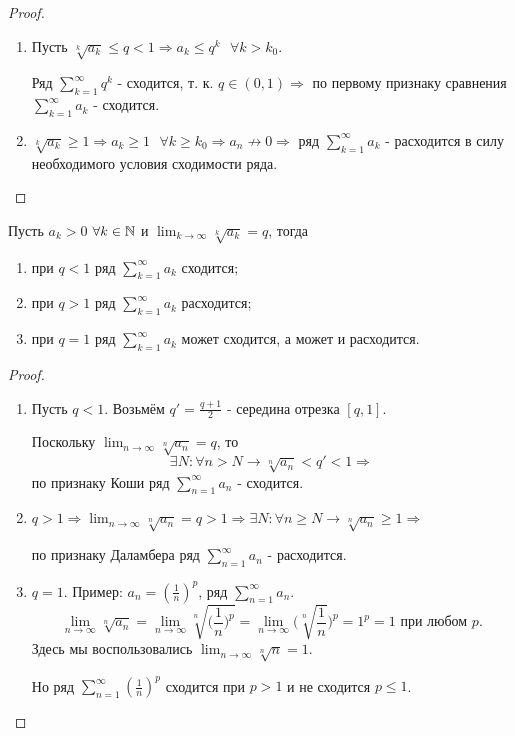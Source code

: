 	\begin{proof}
		\begin{enumerate}
			\item Пусть $\sqrt[k]{a_k} \leqslant q < 1 \Rightarrow a_k \leqslant q^k \text{ } \forall k > k_0$.
			
			Ряд $\sum_{k = 1}^{\infty} q^k$ - сходится, т. к. $q \in (0, 1) \Rightarrow$ по первому признаку сравнения $\sum_{k = 1}^{\infty} a_k$ - сходится.
			\item $\sqrt[k]{a_k} \geqslant 1 \Rightarrow a_k \geqslant 1 \text{ } \forall k \geqslant k_0 \Rightarrow a_n \not\rightarrow 0 \Rightarrow$ ряд $\sum_{k = 1}^{\infty} a_k$ - расходится в силу необходимого условия сходимости ряда.
		\end{enumerate}
	\end{proof}
	
	\begin{corollary}
		Пусть $a_k > 0$ $\forall k \in \mathbb N$ и $\displaystyle \lim_{k \to \infty} {\sqrt[k]{a_k}} = q$, тогда
		
		\begin{enumerate}
			\item при $q < 1$ ряд $\displaystyle \sum_{k = 1}^{\infty} {a_k}$ сходится;
			\item при $q > 1$ ряд $\displaystyle \sum_{k = 1}^{\infty} {a_k}$ расходится;
			\item при $q = 1$ ряд $\displaystyle \sum_{k = 1}^{\infty} {a_k}$ может сходится, а может и расходится.
		\end{enumerate}
	\end{corollary}
	
	\begin{proof}
		\begin{enumerate}
			\item Пусть $q < 1$. Возьмём $q' = \frac{q + 1}{2}$ - середина отрезка $[q, 1]$.
			
			Поскольку $\lim_{n \to \infty} \sqrt[n]{a_n} = q$, то 
			\[ \exists N: \forall n > N \rightarrow \sqrt[n]{a_n} < q' < 1 \Rightarrow \]
			по признаку Коши ряд $\sum_{n = 1}^{\infty} a_n$ - сходится.
			
			\item $q > 1 \Rightarrow \lim_{n \to \infty} \sqrt[n]{a_n} = q > 1 \Rightarrow \exists N: \forall n \geqslant N \rightarrow \sqrt[n]{a_n} \geqslant 1 \Rightarrow$
			
			по признаку Даламбера ряд $\sum_{n = 1}^{\infty} a_n$ - расходится.
			
			\item $q = 1$. Пример: $a_n = (\frac{1}{n})^p$, ряд $\sum_{n = 1}^{\infty} a_n$.
			\[ \lim_{n \to \infty} \sqrt[n]{a_n} = \lim_{n \to \infty} \sqrt[n]{\bigg(\frac{1}{n}\bigg)^p} = \lim_{n \to \infty} \bigg(\sqrt[n]{\frac{1}{n}}\bigg)^p = 1^p = 1 \text{ при любом } p. \]
			Здесь мы воспользовались $\lim_{n \to \infty} \sqrt[n]{n} = 1$.
			
			Но ряд $\sum_{n = 1}^{\infty} (\frac{1}{n})^p$ сходится при $p > 1$ и не сходится $p \leqslant 1$.
		\end{enumerate}
	\end{proof}
	
